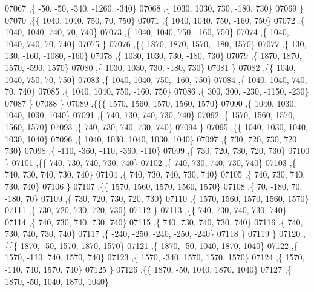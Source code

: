 \begin{DoxyCode}
07067     ,\{   -50,   -50,  -340, -1260,  -340\}
07068     ,\{  1030,  1030,   730,  -180,   730\}
07069     \}
07070    ,\{\{  1040,  1040,   750,    70,   750\}
07071     ,\{  1040,  1040,   750,  -160,   750\}
07072     ,\{  1040,  1040,   740,    70,   740\}
07073     ,\{  1040,  1040,   750,  -160,   750\}
07074     ,\{  1040,  1040,   740,    70,   740\}
07075     \}
07076    ,\{\{  1870,  1870,  1570,  -180,  1570\}
07077     ,\{   130,   130,  -160, -1080,  -160\}
07078     ,\{  1030,  1030,   730,  -180,   730\}
07079     ,\{  1870,  1870,  1570,  -590,  1570\}
07080     ,\{  1030,  1030,   730,  -180,   730\}
07081     \}
07082    ,\{\{  1040,  1040,   750,    70,   750\}
07083     ,\{  1040,  1040,   750,  -160,   750\}
07084     ,\{  1040,  1040,   740,    70,   740\}
07085     ,\{  1040,  1040,   750,  -160,   750\}
07086     ,\{   300,   300,  -230, -1150,  -230\}
07087     \}
07088    \}
07089   ,\{\{\{  1570,  1560,  1570,  1560,  1570\}
07090     ,\{  1040,  1030,  1040,  1030,  1040\}
07091     ,\{   740,   730,   740,   730,   740\}
07092     ,\{  1570,  1560,  1570,  1560,  1570\}
07093     ,\{   740,   730,   740,   730,   740\}
07094     \}
07095    ,\{\{  1040,  1030,  1040,  1030,  1040\}
07096     ,\{  1040,  1030,  1040,  1030,  1040\}
07097     ,\{   730,   720,   730,   720,   730\}
07098     ,\{  -110,  -360,  -110,  -360,  -110\}
07099     ,\{   730,   720,   730,   720,   730\}
07100     \}
07101    ,\{\{   740,   730,   740,   730,   740\}
07102     ,\{   740,   730,   740,   730,   740\}
07103     ,\{   740,   730,   740,   730,   740\}
07104     ,\{   740,   730,   740,   730,   740\}
07105     ,\{   740,   730,   740,   730,   740\}
07106     \}
07107    ,\{\{  1570,  1560,  1570,  1560,  1570\}
07108     ,\{    70,  -180,    70,  -180,    70\}
07109     ,\{   730,   720,   730,   720,   730\}
07110     ,\{  1570,  1560,  1570,  1560,  1570\}
07111     ,\{   730,   720,   730,   720,   730\}
07112     \}
07113    ,\{\{   740,   730,   740,   730,   740\}
07114     ,\{   740,   730,   740,   730,   740\}
07115     ,\{   740,   730,   740,   730,   740\}
07116     ,\{   740,   730,   740,   730,   740\}
07117     ,\{  -240,  -250,  -240,  -250,  -240\}
07118     \}
07119    \}
07120   ,\{\{\{  1870,   -50,  1570,  1870,  1570\}
07121     ,\{  1870,   -50,  1040,  1870,  1040\}
07122     ,\{  1570,  -110,   740,  1570,   740\}
07123     ,\{  1570,  -340,  1570,  1570,  1570\}
07124     ,\{  1570,  -110,   740,  1570,   740\}
07125     \}
07126    ,\{\{  1870,   -50,  1040,  1870,  1040\}
07127     ,\{  1870,   -50,  1040,  1870,  1040\}

\end{DoxyCode}
